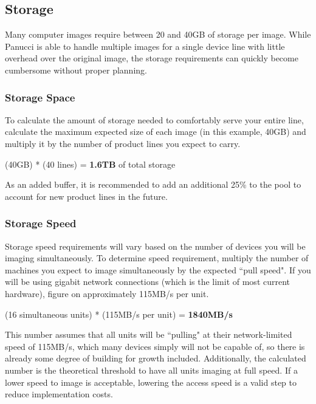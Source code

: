 \documentclass{article}
\begin{document}
\begin{flushleft}
\subsection{Storage}
Many computer images require between 20 and 40GB of storage per image.  While Panucci is able to handle multiple images for a single device line with little overhead over the original image, the storage requirements can quickly become cumbersome without proper planning.

\subsubsection{Storage Space}
To calculate the amount of storage needed to comfortably serve your entire line, calculate the maximum expected size of each image (in this example, 40GB) and multiply it by the number of product lines you expect to carry.
\begin{center}
(40GB) * (40 lines) = \textbf{1.6TB} of total storage
\end{center}
As an added buffer, it is recommended to add an additional 25\% to the pool to account for new product lines in the future.
\subsubsection{Storage Speed}
Storage speed requirements will vary based on the number of devices you will be imaging simultaneously.
To determine speed requirement, multiply the number of machines you expect to image simultaneously by the expected ``pull speed".  If you will be using gigabit network connections (which is the limit of most current hardware), figure on approximately 115MB/s per unit.
\begin{center}
  (16 simultaneous units) * (115MB/s per unit) = \textbf{1840MB/s}
\end{center}
This number assumes that all units will be ``pulling" at their network-limited speed of 115MB/s, which many devices simply will not be capable of, so there is already some degree of building for growth included.\linebreak
Additionally, the calculated number is the theoretical threshold to have all units imaging at full speed.  If a lower speed to image is acceptable, lowering the access speed is a valid step to reduce implementation costs.\linebreak\linebreak

\end{flushleft}
\end{document}
